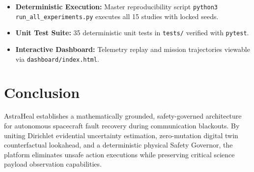 \documentclass[10pt,twocolumn]{article}
\begin{document}
\begin{itemize}
    \item \textbf{Deterministic Execution:} Master reproducibility script \texttt{python3 run\_all\_experiments.py} executes all 15 studies with locked seeds.
    \item \textbf{Unit Test Suite:} 35 deterministic unit tests in \texttt{tests/} verified with \texttt{pytest}.
    \item \textbf{Interactive Dashboard:} Telemetry replay and mission trajectories viewable via \texttt{dashboard/index.html}.
\end{itemize}

\section{Conclusion}
AstraHeal establishes a mathematically grounded, safety-governed architecture for autonomous spacecraft fault recovery during communication blackouts. By uniting Dirichlet evidential uncertainty estimation, zero-mutation digital twin counterfactual lookahead, and a deterministic physical Safety Governor, the platform eliminates unsafe action executions while preserving critical science payload observation capabilities.
\end{document}
